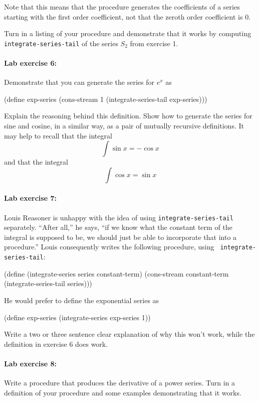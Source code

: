 Note that this means that the procedure generates the coefficients of
a series starting with the first order coefficient, not that the
zeroth order coefficient is 0.

Turn in a listing of your procedure and demonstrate that it works by
computing {\tt integrate-series-tail} of the series $S_2$ from
exercise 1.

\paragraph{Lab exercise 6:} Demonstrate that you can generate the
series for $e^x$ as

\beginlisp
(define exp-series
  (cons-stream 1 (integrate-series-tail exp-series)))
\endlisp

\noindent Explain the reasoning behind this definition.  Show how to generate
the series for sine and cosine, in a similar way, as a pair of mutually
recursive definitions.  It may help to recall that the integral
\[\int \sin x =  - \cos x\]
and that the integral
\[\int \cos x = \sin x\]


\paragraph{Lab exercise 7:} Louis Reasoner is unhappy with the idea
of using {\tt integrate-series-tail} separately.  ``After all,'' he
says, ``if we know what the constant term of the integral is supposed
to be, we should just be able to incorporate that into a procedure.''
Louis consequently writes the following procedure, using {\tt
integrate-series-tail}:

\beginlisp
(define (integrate-series series constant-term)
  (cons-stream constant-term (integrate-series-tail series)))
\endlisp

\noindent
He would prefer to define the exponential series as

\beginlisp
(define exp-series
  (integrate-series exp-series 1))
\endlisp

\noindent
Write a two or three sentence clear explanation of why this won't
work, while the definition in exercise 6 does work.

\paragraph{Lab exercise 8:} Write a procedure that produces the
derivative of a power series.  Turn in a definition of your procedure
and some examples demonstrating that it works.

